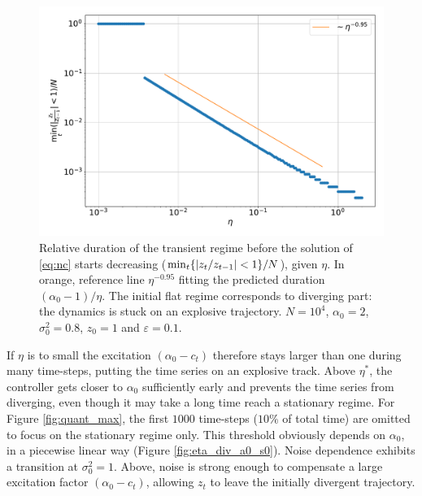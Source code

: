 \documentclass[FinalReport.tex]{subfiles}
\begin{document}
\begin{figure}[h!]
\centering
	\centering
	\includegraphics[width=.8\textwidth]{Graphs/nc_conv.pdf}
	\caption{Relative duration of the transient regime before the solution of \eqref{eq:nc} starts decreasing ($\min_t\{\abs{z_t/z_{t-1}}<1\}/N$), given $\eta$. In orange, reference line $\eta^{-0.95}$ fitting the predicted duration $(\alpha_0-1)/\eta$. The initial flat regime corresponds to diverging part: the dynamics is stuck on an explosive trajectory. $N=10^4$, $\alpha_0=2$, $\sigma_0^2=0.8$, $z_0=1$ and $\varepsilon=0.1$.}
	\label{fig:nc_conv}	
\end{figure}
 
 If $\eta$ is to small the excitation $(\alpha_0-c_t)$ therefore stays larger than one during many time-steps, putting the time series on an explosive track. Above $\eta^*$, the controller gets closer to $\alpha_0$ sufficiently early and prevents the time series from diverging, even though it may take a long time reach a stationary regime. For Figure \ref{fig:quant_max}, the first $1000$ time-steps ($10\%$ of total time) are omitted to focus on the stationary regime only. This threshold obviously depends on $\alpha_0$, in a piecewise linear way  (Figure \ref{fig:eta_div_a0_s0}). Noise dependence exhibits a transition at $\sigma_0^2=1$. Above, noise is strong enough to compensate a large excitation factor $(\alpha_0-c_t)$, allowing $z_t$ to leave the initially divergent trajectory.
\end{document}
